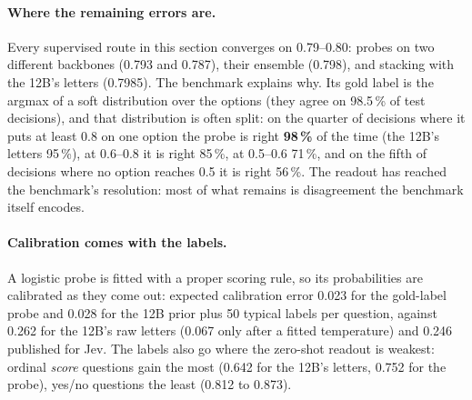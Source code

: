\documentclass[11pt,a4paper]{article}
\begin{document}
\paragraph{Where the remaining errors are.} Every supervised route in this section converges on 0.79--0.80: probes on two different backbones (0.793 and 0.787), their ensemble (0.798), and stacking with the 12B's letters (0.7985). The benchmark explains why. Its gold label is the argmax of a soft distribution over the options (they agree on 98.5\,\% of test decisions), and that distribution is often split: on the quarter of decisions where it puts at least 0.8 on one option the probe is right \textbf{98\,\%} of the time (the 12B's letters 95\,\%), at 0.6--0.8 it is right 85\,\%, at 0.5--0.6 71\,\%, and on the fifth of decisions where no option reaches 0.5 it is right 56\,\%. The readout has reached the benchmark's resolution: most of what remains is disagreement the benchmark itself encodes.

\paragraph{Calibration comes with the labels.} A logistic probe is fitted with a proper scoring rule, so its probabilities are calibrated as they come out: expected calibration error 0.023 for the gold-label probe and 0.028 for the 12B prior plus 50 typical labels per question, against 0.262 for the 12B's raw letters (0.067 only after a fitted temperature) and 0.246 published for Jev. The labels also go where the zero-shot readout is weakest: ordinal \emph{score} questions gain the most (0.642 for the 12B's letters, 0.752 for the probe), yes/no questions the least (0.812 to 0.873).
\end{document}
